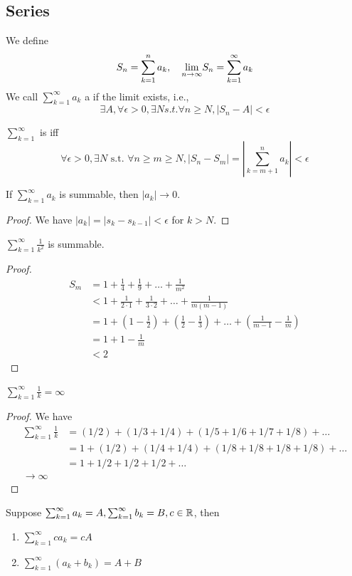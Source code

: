 \documentclass[11pt]{article}
\begin{document}
\subsection{Series}
We define
$$S_n = \sum_{k=1}^n a_k, \quad \underset{n \rightarrow \infty}{\lim} S_n = \sum_{k=1}^\infty a_k$$
We call $\sum_{k=1}^\infty a_k$ a  if the limit exists,
 i.e.,
 $$\exists A, \forall \epsilon > 0, \exists N s.t. \forall n \geq N, |S_n - A| < \epsilon$$

 $\sum_{k=1}^\infty$ is  iff 
$$\forall \epsilon > 0, \exists N \text{ s.t. } \forall n \geq m \geq N, |S_n - S_m| = \left|\sum_{k=m+1}^n a_k \right |< \epsilon $$

\corollary If $\sum_{k=1}^\infty a_k$ is summable, then $|a_k| \rightarrow 0$.
\begin{proof}
	We have $|a_k| = |s_k - s_{k-1}| < \epsilon$ for $k > N$.
\end{proof}

\example
$\sum_{k=1}^\infty \frac{1}{k^2}$ is summable.
\begin{proof}
	\begin{align*}
		S_m &= 1 + \frac{1}{4} + \frac{1}{9} + \hdots + \frac{1}{m^2} \\
		&< 1 + \frac{1}{2\cdot1} + \frac{1}{3\cdot 2} + \hdots + \frac{1}{m(m-1)} \\
		&= 1 + (1-\frac{1}{2}) + (\frac{1}{2} - \frac{1}{3}) + \hdots + (\frac{1}{m-1} - \frac{1}{m}) \\
		&= 1 + 1 - \frac{1}{m} \\
		&< 2
	\end{align*}
\end{proof}

\example
$\sum_{k=1}^\infty \frac{1}{k} = \infty$
\begin{proof}
	We have
	\begin{align*}
		\sum_{k=1}^\infty \frac{1}{k} &= (1/2) + (1/3 + 1/4) + (1/5 + 1/6 + 1/7 + 1/8) + \hdots \\
		&= 1 + (1/2) + (1/4 + 1/4) + (1/8 + 1/8 + 1/8 + 1/8) + \hdots \\
		&= 1 + 1/2 + 1/2 + 1/2 + \hdots \\
		\rightarrow \infty
	\end{align*}
\end{proof}

 Suppose $\sum_{k=1}^\infty a_k = A, \sum_{k=1}^\infty b_k = B, c \in \mathbb{R}$, then
\begin{enumerate}
	\item $\sum_{k=1}^\infty ca_k = cA$
	\item $\sum_{k=1}^\infty (a_k + b_k) = A + B$
\end{enumerate}
\end{document}
